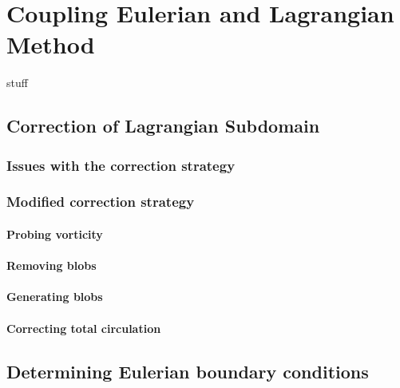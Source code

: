 \chapter{Coupling Eulerian and Lagrangian Method}


stuff

\section{Correction of Lagrangian Subdomain}

	\subsection{Issues with the correction strategy}			

	\subsection{Modified correction strategy}			

	\subsubsection*{Probing vorticity}
	\subsubsection*{Removing blobs}
	\subsubsection*{Generating blobs}
	\subsubsection*{Correcting total circulation}


\section{Determining Eulerian boundary conditions}


